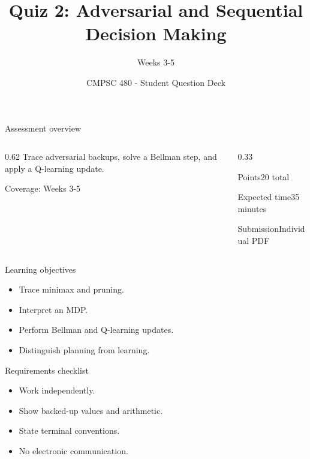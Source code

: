 \documentclass[aspectratio=169,11pt]{beamer}
\title[Quiz 2 Questions]{Quiz 2: Adversarial and Sequential Decision Making}
\subtitle{Weeks 3-5}
\author{CMPSC 480 - Student Question Deck}
\date{}
\begin{document}
\begin{frame}
  \titlepage
\end{frame}

\begin{frame}{Assessment overview}
\begin{columns}[T,onlytextwidth]
\begin{column}{0.62\textwidth}
\Large Trace adversarial backups, solve a Bellman step, and apply a Q-learning update.

\vspace{0.35cm}
\normalsize
Coverage: Weeks 3-5
\end{column}
\begin{column}{0.33\textwidth}
\begin{block}{Points}20 total\end{block}
\begin{block}{Expected time}35 minutes\end{block}
\begin{block}{Submission}Individual PDF\end{block}
\end{column}
\end{columns}
\end{frame}

\begin{frame}{Learning objectives}
\begin{itemize}
  \item Trace minimax and pruning.
  \item Interpret an MDP.
  \item Perform Bellman and Q-learning updates.
  \item Distinguish planning from learning.
\end{itemize}
\end{frame}

\begin{frame}{Requirements checklist}
\small
\begin{itemize}
  \item Work independently.
  \item Show backed-up values and arithmetic.
  \item State terminal conventions.
  \item No electronic communication.
\end{itemize}
\end{frame}
\end{document}
